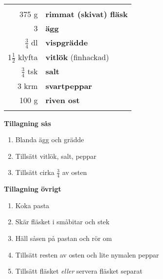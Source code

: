 \begin{table}[H]
	\begin{tabular}{rl}
	\hline
	&\\
		375 g & \textbf{rimmat (skivat) fläsk}\\
		3 & \textbf{ägg}\\
		$\frac{3}{4}$ dl & \textbf{vispgrädde}\\
		1$\frac{1}{2}$ klyfta & \textbf{vitlök} (finhackad)\\
		$\frac{3}{4}$ tsk & \textbf{salt}\\
		3 krm & \textbf{svartpeppar}\\
		100 g & \textbf{riven ost}\\
	&\\
	\hline
	\end{tabular}
\end{table}


\begin{multicols*}{2}

\noindent \textbf{Tillagning sås}
\begin{enumerate}
	\itemsep0cm
	\item Blanda ägg och grädde
	\item Tillsätt vitlök, salt, peppar
	\item Tillsätt cirka $\frac{3}{4}$ av osten
\end{enumerate}

\noindent \textbf{Tillagning övrigt}
\begin{enumerate}
	\itemsep0cm
	\item Koka pasta
	\item Skär fläsket i småbitar och stek
	\item Häll såsen på pastan och rör om
	\item Tillsätt resten av osten och lite nymalen peppar
	\item Tillsätt fläsket \textit{eller} servera fläsket separat
\end{enumerate}

\end{multicols*}

\clearpage